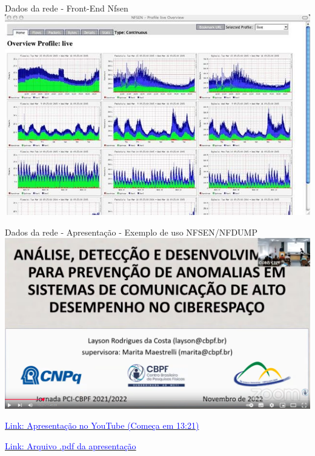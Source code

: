 \begin{frame}{Dados da rede - Front-End Nfsen}
    \centering
    \includegraphics[width=0.75\linewidth]{Figuras/front-end-nfsen.png}
    \vspace{0.3cm}




\end{frame}


\begin{frame}{Dados da rede - Apresentação - Exemplo de uso NFSEN/NFDUMP}
    \centering
    \includegraphics[width=0.75\linewidth]{Figuras/apresentacao-nfdump-nfsen-layson.png}
    \vspace{0.3cm}


    \href{https://www.youtube.com/watch?v=vmK7_SBREm4}{\textcolor{blue}{Link: Apresentação no YouTube (Começa em 13:21)}}

    \href{https://www.gov.br/cbpf/pt-br/pesquisa-e-desenvolvimento/capacitacao-institucional-pci/jornada/apresentacaolaysonrodrigues.pdf}{\textcolor{blue}{Link: Arquivo .pdf da apresentação}}

\end{frame}


